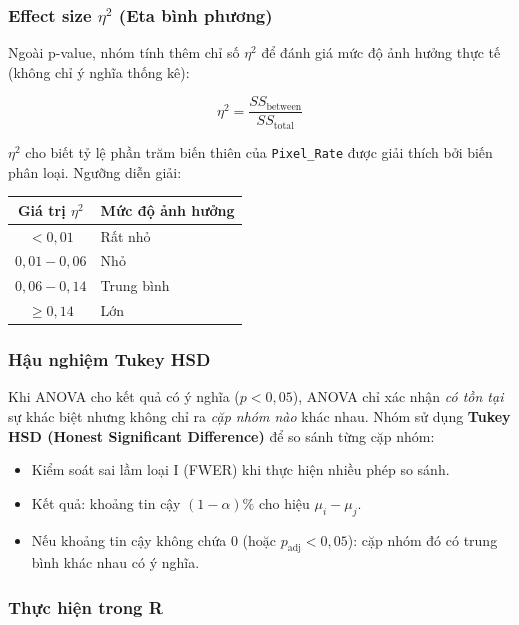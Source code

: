 \subsubsection{Effect size $\eta^2$ (Eta bình phương)}

Ngoài p-value, nhóm tính thêm chỉ số \textbf{$\eta^2$} để đánh giá mức độ
ảnh hưởng thực tế (không chỉ ý nghĩa thống kê):

\[
  \eta^2 = \frac{SS_{\text{between}}}{SS_{\text{total}}}
\]

$\eta^2$ cho biết tỷ lệ phần trăm biến thiên của \texttt{Pixel\_Rate} được giải
thích bởi biến phân loại. Ngưỡng diễn giải:

\begin{center}
\begin{tabular}{cl}
  \toprule
  \textbf{Giá trị $\eta^2$} & \textbf{Mức độ ảnh hưởng} \\
  \midrule
  $< 0{,}01$         & Rất nhỏ \\
  $0{,}01 - 0{,}06$  & Nhỏ \\
  $0{,}06 - 0{,}14$  & Trung bình \\
  $\geq 0{,}14$      & Lớn \\
  \bottomrule
\end{tabular}
\end{center}

\subsubsection{Hậu nghiệm Tukey HSD}

Khi ANOVA cho kết quả có ý nghĩa ($p < 0{,}05$), ANOVA chỉ xác nhận
\emph{có tồn tại} sự khác biệt nhưng không chỉ ra \emph{cặp nhóm nào} khác nhau.
Nhóm sử dụng \textbf{Tukey HSD (Honest Significant Difference)} để so sánh từng
cặp nhóm:
\begin{itemize}
  \item Kiểm soát sai lầm loại I (FWER) khi thực hiện nhiều phép so sánh.
  \item Kết quả: khoảng tin cậy $(1-\alpha)\%$ cho hiệu $\mu_i - \mu_j$.
  \item Nếu khoảng tin cậy không chứa 0 (hoặc $p_{\text{adj}} < 0{,}05$):
        cặp nhóm đó có trung bình khác nhau có ý nghĩa.
\end{itemize}

\subsubsection{Thực hiện trong R}

